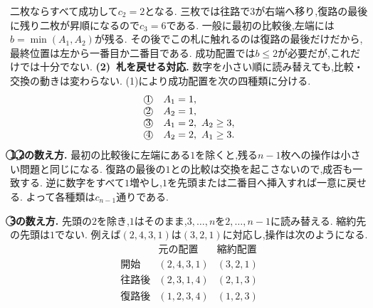 \begin{enumerate}[label=\textbf{問\arabic*.},leftmargin=3.8em,format=\bookitemlink{practice-entrance}{solution}{problem}]
                  二枚ならすべて成功して$c_2=2$となる.
                  三枚では往路で$3$が右端へ移り,復路の最後に残り二枚が昇順になるので$c_3=6$である.
                  一般に最初の比較後,左端には$b=\min(A_1,A_2)$が残る.
                  その後でこの札に触れるのは復路の最後だけだから,最終位置は左から一番目か二番目である.
                  成功配置では$b\le2$が必要だが,これだけでは十分でない.
                  \smallskip\textbf{(2)~札を戻せる対応.}
                  数字を小さい順に読み替えても,比較・交換の動きは変わらない.
                  (1)により成功配置を次の四種類に分ける.
                  \[
                  \begin{array}{ll}
                    \text{\textcircled{1}}&A_1=1,\\
                    \text{\textcircled{2}}&A_2=1,\\
                    \text{\textcircled{3}}&A_1=2,\ A_2\ge3,\\
                    \text{\textcircled{4}}&A_2=2,\ A_1\ge3.
                  \end{array}
                  \]
                  \textbf{\textcircled{1},\textcircled{2}の数え方.}
                  最初の比較後に左端にある$1$を除くと,残る$n-1$枚への操作は小さい問題と同じになる.
                  復路の最後の$1$との比較は交換を起こさないので,成否も一致する.
                  逆に数字をすべて$1$増やし,$1$を先頭または二番目へ挿入すれば一意に戻せる.
                  よって各種類は$c_{n-1}$通りである.
                  \par\textbf{\textcircled{3}の数え方.}
                  先頭の$2$を除き,$1$はそのまま,$3,\ldots,n$を$2,\ldots,n-1$に読み替える.
                  縮約先の先頭は$1$でない.
                  例えば$(2,4,3,1)$は$(3,2,1)$に対応し,操作は次のようになる.
                  \[
                  \begin{array}{c|c|c}
                    &\text{元の配置}&\text{縮約配置}\\ \hline
                    \text{開始}&(2,4,3,1)&(3,2,1)\\
                    \text{往路後}&(2,3,1,4)&(2,1,3)\\
                    \text{復路後}&(1,2,3,4)&(1,2,3)
                  \end{array}
                  \]

\end{enumerate}
